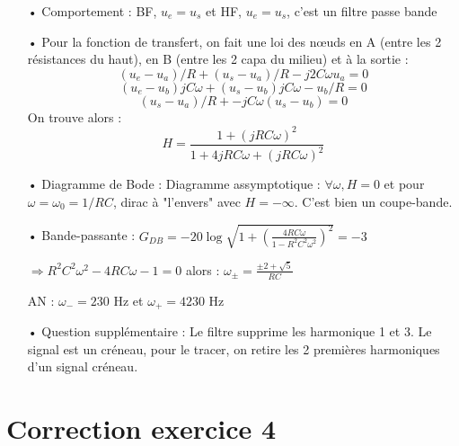 \documentclass{report}
\begin{document}
\begin{itemize}
	\item[•] Comportement : BF, $u_e=u_s$ et HF, $u_e=u_s$, c'est un filtre passe bande
	
	\item[•]
		Pour la fonction de transfert, on fait une loi des nœuds en A (entre les 2 résistances du haut), en B (entre les 2 capa du milieu) et à la sortie :
	\begin{equation}
		(u_e-u_a)/R+(u_s-u_a)/R-j2C\omega u_a=0
	\end{equation}
	\begin{equation}
		(u_e-u_b)jC\omega+(u_s-u_b)jC\omega-u_b/R=0
	\end{equation}
	\begin{equation}
		(u_s-u_a)/R+-jC\omega(u_s-u_b)=0
	\end{equation}
	On trouve alors :
	\begin{equation}
		H =\frac{1+(jRC\omega)^2}{1+4jRC\omega + (jRC\omega)^2}
	\end{equation}
	
	\item[•]
	Diagramme de Bode :
Diagramme assymptotique :  $\forall \omega, H=0$ et pour $\omega=\omega_0=1/RC$, dirac à "l'envers" avec $H=-\infty$. C'est bien un coupe-bande.

	\item[•] Bande-passante :
	$G_{DB} = -20\log \sqrt{1+\left( \frac{4RC\omega}{1-R^2C^2\omega^2}\right) ^2}=-3$ 
	
	$\Rightarrow R^2C^2\omega^2 - 4RC\omega -1=0$
	alors : $\omega_{\pm}=\frac{\pm 2+\sqrt{5}}{RC}$
	
	AN : $\omega_- = 230$ Hz et $\omega_+ = 4230$ Hz
	
	\item[•] Question supplémentaire : 
	Le filtre supprime les harmonique 1 et 3. Le signal est un créneau, pour le tracer, on retire les 2 premières harmoniques d'un signal créneau.
\end{itemize}

\section*{Correction exercice 4}
\end{document}
